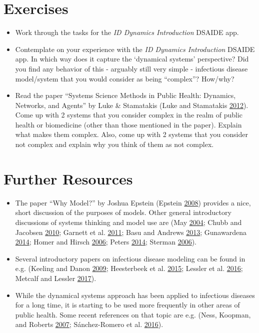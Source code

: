 \documentclass[]{book}
\providecommand{\tightlist}{%
  \setlength{\itemsep}{0pt}\setlength{\parskip}{0pt}}
\theoremstyle{definition}
\theoremstyle{definition}
\theoremstyle{definition}
\theoremstyle{remark}
\begin{document}
\section{Exercises}\label{exercises}

\begin{itemize}
\tightlist
\item
  Work through the tasks for the \emph{ID Dynamics Introduction} DSAIDE
  app.
\item
  Contemplate on your experience with the \emph{ID Dynamics
  Introduction} DSAIDE app. In which way does it capture the `dynamical
  systems' perspective? Did you find any behavior of this - arguably
  still very simple - infectious disease model/system that you would
  consider as being ``complex''? How/why?
\item
  Read the paper ``Systems Science Methods in Public Health: Dynamics,
  Networks, and Agents'' by Luke \& Stamatakis (Luke and Stamatakis
  \protect\hyperlink{ref-luke12}{2012}). Come up with 2 systems that you
  consider complex in the realm of public health or biomedicine (other
  than those mentioned in the paper). Explain what makes them complex.
  Also, come up with 2 systems that you consider not complex and explain
  why you think of them as not complex.
\end{itemize}

\section{Further Resources}\label{further-resources}

\begin{itemize}
\tightlist
\item
  The paper ``Why Model?'' by Joshua Epstein (Epstein
  \protect\hyperlink{ref-epstein08}{2008}) provides a nice, short
  discussion of the purposes of models. Other general introductory
  discussions of systems thinking and model use are (May
  \protect\hyperlink{ref-may04}{2004}; Chubb and Jacobsen
  \protect\hyperlink{ref-chubb10}{2010}; Garnett et al.
  \protect\hyperlink{ref-garnett11}{2011}; Basu and Andrews
  \protect\hyperlink{ref-basu13}{2013}; Gunawardena
  \protect\hyperlink{ref-gunawardena14}{2014}; Homer and Hirsch
  \protect\hyperlink{ref-homer06}{2006}; Peters
  \protect\hyperlink{ref-peters14}{2014}; Sterman
  \protect\hyperlink{ref-sterman06}{2006}).
\item
  Several introductory papers on infectious disease modeling can be
  found in e.g. (Keeling and Danon
  \protect\hyperlink{ref-keeling09}{2009}; Heesterbeek et al.
  \protect\hyperlink{ref-heesterbeek15}{2015}; Lessler et al.
  \protect\hyperlink{ref-lessler16}{2016}; Metcalf and Lessler
  \protect\hyperlink{ref-metcalf17}{2017}).
\item
  While the dynamical systems approach has been applied to infectious
  diseases for a long time, it is starting to be used more frequently in
  other areas of public health. Some recent references on that topic are
  e.g. (Ness, Koopman, and Roberts \protect\hyperlink{ref-ness07}{2007};
  Sánchez-Romero et al. \protect\hyperlink{ref-sanchez-romero16}{2016}).
\end{itemize}
\end{document}
